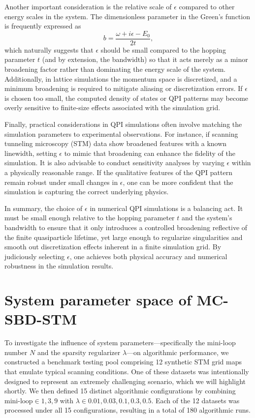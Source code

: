 Another important consideration is the relative scale of $\epsilon$ compared to other energy scales in the system. The dimensionless parameter in the Green’s function is frequently expressed as
\[
b = \frac{\omega + i\epsilon - E_0}{2t},
\]
which naturally suggests that $\epsilon$ should be small compared to the hopping parameter $t$ (and by extension, the bandwidth) so that it acts merely as a minor broadening factor rather than dominating the energy scale of the system. Additionally, in lattice simulations the momentum space is discretized, and a minimum broadening is required to mitigate aliasing or discretization errors. If $\epsilon$ is chosen too small, the computed density of states or QPI patterns may become overly sensitive to finite-size effects associated with the simulation grid.

Finally, practical considerations in QPI simulations often involve matching the simulation parameters to experimental observations. For instance, if scanning tunneling microscopy (STM) data show broadened features with a known linewidth, setting $\epsilon$ to mimic that broadening can enhance the fidelity of the simulation. It is also advisable to conduct sensitivity analyses by varying $\epsilon$ within a physically reasonable range. If the qualitative features of the QPI pattern remain robust under small changes in $\epsilon$, one can be more confident that the simulation is capturing the correct underlying physics.

In summary, the choice of $\epsilon$ in numerical QPI simulations is a balancing act. It must be small enough relative to the hopping parameter $t$ and the system's bandwidth to ensure that it only introduces a controlled broadening reflective of the finite quasiparticle lifetime, yet large enough to regularize singularities and smooth out discretization effects inherent in a finite simulation grid. By judiciously selecting $\epsilon$, one achieves both physical accuracy and numerical robustness in the simulation results.

\chapter{System parameter space of MC-SBD-STM}\label{appen:system_param}
To investigate the influence of system parameters—specifically the mini-loop number $N$ and the sparsity regularizer $\lambda$—on algorithmic performance, we constructed a benchmark testing pool comprising 12 synthetic \ac{STM} grid maps that emulate typical scanning conditions. One of these datasets was intentionally designed to represent an extremely challenging scenario, which we will highlight shortly. We then defined 15 distinct algorithmic configurations by combining $\text{mini-loop} \in {1, 3, 9}$ with $\lambda \in {0.01, 0.03, 0.1, 0.3, 0.5}$. Each of the 12 datasets was processed under all 15 configurations, resulting in a total of 180 algorithmic runs.


